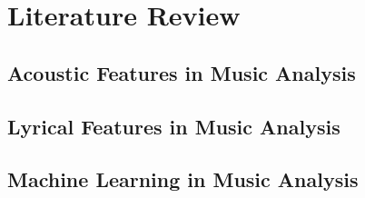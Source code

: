 \chapter{Literature Review}
\label{cha:literaturereview}


\section{Acoustic Features in Music Analysis}
\label{sec:acousticfeaturesinmusicanalysis}


\section{Lyrical Features in Music Analysis}
\label{sec:lyricalfeaturesinmusicanalysis}


\section{Machine Learning in Music Analysis}
\label{sec:machinelearningfeaturesinmusicanalysis}




